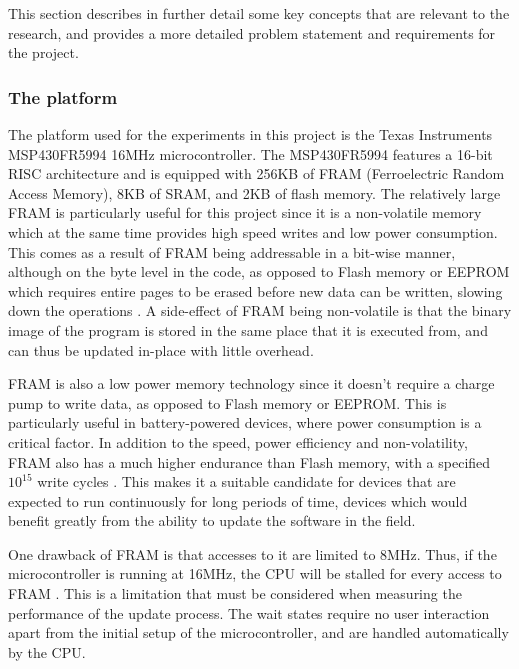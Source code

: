 This section describes in further detail some key concepts that are relevant to the research, and provides a more detailed problem statement and requirements for the project.

\subsubsection*{The platform}\label{sec:platform}
The platform used for the experiments in this project is the Texas Instruments MSP430FR5994 16MHz microcontroller. The MSP430FR5994 features a 16-bit RISC architecture and is equipped with 256KB of FRAM (Ferroelectric Random Access Memory), 8KB of SRAM, and 2KB of flash memory. The relatively large FRAM is particularly useful for this project since it is a non-volatile memory which at the same time provides high speed writes and low power consumption. This comes as a result of FRAM being addressable in a bit-wise manner, although on the byte level in the code, as opposed to Flash memory or EEPROM which requires entire pages to be erased before new data can be written, slowing down the operations \cite{framReport}. A side-effect of FRAM being non-volatile is that the binary image of the program is stored in the same place that it is executed from, and can thus be updated in-place with little overhead.

FRAM is also a low power memory technology since it doesn't require a charge pump to write data, as opposed to Flash memory or EEPROM. This is particularly useful in battery-powered devices, where power consumption is a critical factor. In addition to the speed, power efficiency and non-volatility, FRAM also has a much higher endurance than Flash memory, with a specified $10^{15}$ write cycles \cite{framReport}. This makes it a suitable candidate for devices that are expected to run continuously for long periods of time, devices which would benefit greatly from the ability to update the software in the field.

One drawback of FRAM is that accesses to it are limited to 8MHz. Thus, if the microcontroller is running at 16MHz, the CPU will be stalled for every access to FRAM \cite{framReport}. This is a limitation that must be considered when measuring the performance of the update process. The wait states require no user interaction apart from the initial setup of the microcontroller, and are handled automatically by the CPU.

